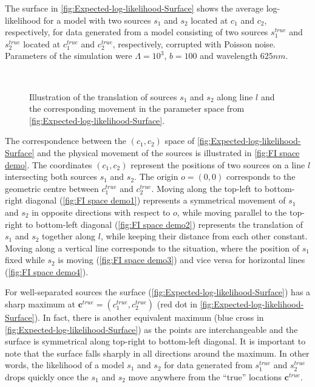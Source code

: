 The surface in \autoref{fig:Expected-log-likelihood-Surface} shows the average log-likelihood for a model with two sources $s_1$ and $s_2$ located at $c_1$ and $c_2$, respectively, for data generated from a model consisting of two sources $s_1^{true}$ and $s_2^{true}$ located at $c_1^{true}$ and $c_2^{true}$, respectively, corrupted with Poisson noise. Parameters of the simulation were $\Lambda=10^3$, $b=100$ and wavelength $625 \unit{nm}$.

\begin{figure}[!tb]
	\newcommand{\wf}{.48\textwidth}
	\centering
	 \\
	\caption{Illustration of the translation of sources $s_1$ and $s_2$ along line $l$ and the corresponding movement in the parameter space from \autoref{fig:Expected-log-likelihood-Surface}.}
	\label{fig:FI space demo}
\end{figure}
%
The correspondence between the $(c_1,c_2)$ space of \autoref{fig:Expected-log-likelihood-Surface} and the physical movement of the sources is illustrated in \autoref{fig:FI space demo}. The coordinates $(c_1,c_2)$ represent the positions of two sources on a line $l$ intersecting both sources $s_1$ and  $s_2$. The origin $o=(0,0)$ corresponds to the geometric centre between $c_1^{true}$ and $c_2^{true}$. Moving along the top-left to bottom-right diagonal (\autoref{fig:FI space demo1}) represents a symmetrical movement of $s_1$ and $s_2$  in opposite directions with respect to $o$, while moving parallel to the top-right to bottom-left diagonal (\autoref{fig:FI space demo2}) represents the translation of $s_1$ and $s_2$ together along $l$, while keeping their distance from each other constant. Moving along a vertical line corresponds to the situation, where the position of $s_1$ fixed while $s_2$ is moving (\autoref{fig:FI space demo3}) and vice versa for horizontal lines (\autoref{fig:FI space demo4}).

For well-separated sources the surface (\autoref{fig:Expected-log-likelihood-Surface}\aaa) has a sharp maximum at $\bm{c}^{true}=(c_1^{true},c_2^{true})$ (red dot in \autoref{fig:Expected-log-likelihood-Surface}\aaa). In fact, there is another equivalent maximum (blue cross in \autoref{fig:Expected-log-likelihood-Surface}\aaa) as the points are interchangeable and the surface is symmetrical along top-right to bottom-left diagonal. It is important to note that the surface falls sharply in all directions around the maximum. In other words, the likelihood of a model $s_1$ and $s_2$ for data generated from $s_1^{true}$ and $s_2^{true}$ drops quickly once the $s_1$ and $s_2$ move anywhere from the ``true'' locations $\bm{c}^{true}$.

